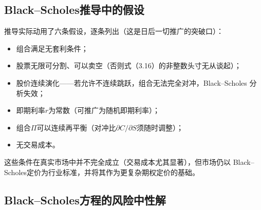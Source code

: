 \subsection{Black--Scholes推导中的假设}

推导实际动用了六条假设，逐条列出（这是日后一切推广的突破口）：
\begin{itemize}
\item 组合满足无套利条件；
\item 股票无限可分割、可以卖空（否则式（3.16）的非整数头寸无从谈起）；
\item 股价连续演化——若允许不连续跳跃，组合无法完全对冲，Black--Scholes
分析失效；
\item 即期利率$r$为常数（可推广为随机即期利率）；
\item 组合$\Pi$可以连续再平衡（对冲比$\partial C/\partial S$须随时调整）；
\item 无交易成本。
\end{itemize}
这些条件在真实市场中并不完全成立（交易成本尤其显著），但市场仍以
Black--Scholes定价为行业标准，并将其作为更复杂期权定价的基础。

\subsection{Black--Scholes方程的风险中性解}

